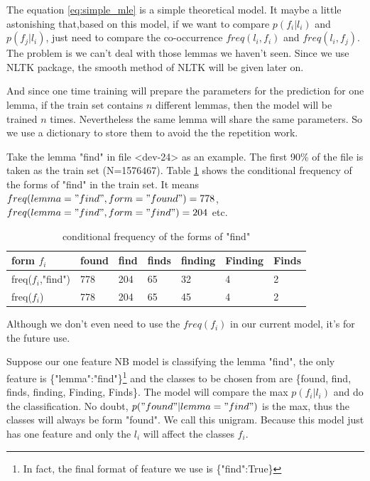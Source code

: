 \documentclass[a4paper]{article}
\begin{document}
The equation \ref{eq:simple_mle} is a simple theoretical model. It maybe a little astonishing that,based on this model, if we want to compare $p(f_i|l_i)$ and $p(f_j|l_i)$, just need to compare the co-occurrence $freq(l_i,f_i)$ and $freq(l_i,f_j)$.  The problem is we can't deal with those lemmas we haven't seen. Since we use NLTK package, the smooth method of NLTK will be given later on. 

And since one time training will prepare the parameters for the prediction for one lemma, if the train set contains $n$ different lemmas, then the model will be trained $n$ times. Nevertheless the same lemma will share the same parameters. So we use a dictionary to store them to avoid the the repetition work.


Take the lemma "find" in file <dev-24> as an example. The first 90\% of the file is taken as the train set (N=1576467). Table \ref{tb:cfd_find} shows the conditional frequency of the forms of "find" in the train set. It means $freq(lemma="find", form="found")=778$, $freq(lemma="find",form="find")=204$ etc.

\begin{table}[htb]
\centering
\begin{tabular}{|l|llllll|}
\hline
form $f_i$       & found & find & finds & finding & Finding & Finds \\ \hline
freq($f_i$,"find") & 778   & 204  & 65    & 32      & 4       & 2     \\ \hline
freq($f_i$) & 778   & 204  & 65    & 45      & 4       & 2     \\ \hline
\end{tabular}
\caption{conditional frequency of the forms of "find"}
\label{tb:cfd_find}
\end{table}

Although we don't even need to use the $freq(f_i)$ in our current model, it's for the future use.

Suppose our one feature NB model is classifying the lemma "find", the only feature is \{"lemma":"find"\}\footnote{In fact, the final format of feature we use is \{"find":True\}} and the classes to be chosen from are \{found, find, finds, finding, Finding, Finds\}. The model will compare the max $p(f_i|l_i)$ and do the classification. No doubt, $p("found" | lemma="find")$ is the max, thus the classes will always be form "found". We call this unigram. Because this model just has one feature and only the $l_i$ will affect the classes $f_i$. 
\end{document}

